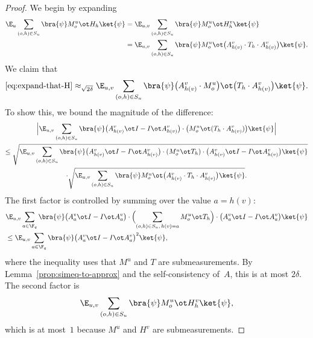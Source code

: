 \begin{proof}
  \leanok
  We begin by expanding
  \begin{align}
    \E_{u} \sum_{(o, h) \in S_{u}} \bra{\psi} M^{u}_o \ot H_h \ket{\psi}
    &= \E_{u,v} \sum_{(o, h) \in S_{u}} \bra{\psi} M^{u}_o \ot H^{v}_h \ket{\psi} \notag\\
    &= \E_{u,v} \sum_{(o, h) \in S_{u}} \bra{\psi} M^{u}_o \ot \bigl(A^{v}_{h(v)} \cdot T_h \cdot A^{v}_{h(v)}\bigr) \ket{\psi}. \label{eq:expand-that-H}
  \end{align}
  We claim that
  \begin{equation}\label{eq:move-first-point-projector}
    \eqref{eq:expand-that-H}
    \approx_{\sqrt{2\delta}}
    \E_{u,v} \sum_{(o, h) \in S_{u}} \bra{\psi} \bigl(A^{v}_{h(v)} \cdot M^{u}_o\bigr) \ot \bigl(T_h \cdot A^{v}_{h(v)}\bigr) \ket{\psi}.
  \end{equation}
  To show this, we bound the magnitude of the difference:
  \begin{multline}
    \Big|\E_{u,v} \sum_{(o, h) \in S_{u}} \bra{\psi} \bigl(A^{v}_{h(v)} \ot I - I \ot A^{v}_{h(v)}\bigr) \cdot \bigl(M^{u}_o \ot (T_h \cdot A^{v}_{h(v)})\bigr)\ket{\psi}\Big|\\
    \leq
    \sqrt{\E_{u,v} \sum_{(o, h) \in S_{u}} \bra{\psi} \bigl(A^{v}_{h(v)} \ot I - I \ot A^{v}_{h(v)}\bigr) \cdot (M^{u}_o \ot T_h) \cdot \bigl(A^{v}_{h(v)} \ot I - I \ot A^{v}_{h(v)}\bigr) \ket{\psi}}\\
    \cdot \sqrt{\E_{u,v} \sum_{(o, h) \in S_{u}} \bra{\psi}  M^{u}_o \ot \bigl(A^{v}_{h(v)} \cdot T_h\cdot  A^{v}_{h(v)}\bigr) \ket{\psi}}. \label{eq:move-first-point-projector-cauchy-schwarz}
  \end{multline}
  The first factor is controlled by summing over the value $a = h(v)$:
  \begin{align*}
    &\E_{u,v} \sum_{a \in \F_q} \bra{\psi} \bigl(A^v_a \ot I - I \ot A^v_a\bigr)
      \cdot \Bigl(\sum_{(o,h)\in S_u,\, h(v)=a} M^u_o \ot T_h\Bigr)
      \cdot \bigl(A^v_a \ot I - I \ot A^v_a\bigr)\ket{\psi} \\
    &\le \E_{u,v} \sum_{a \in \F_q} \bra{\psi} \bigl(A^v_a \ot I - I \ot A^v_a\bigr)^2
      \ket{\psi},
  \end{align*}
  where the inequality uses that $M^u$ and $T$ are submeasurements. By
  Lemma~\ref{prop:simeq-to-approx} and the self-consistency of~$A$, this is at most
  $2\delta$. The second factor is
  \[
    \E_{u,v} \sum_{(o,h)\in S_u} \bra{\psi} M^u_o \ot H^v_h \ket{\psi},
  \]
  which is at most~$1$ because $M^u$ and $H^v$ are submeasurements.


\end{proof}
